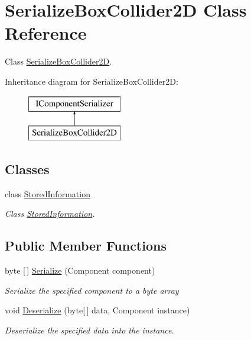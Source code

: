 \hypertarget{class_serialize_box_collider2_d}{}\section{Serialize\+Box\+Collider2D Class Reference}
\label{class_serialize_box_collider2_d}


Class \hyperlink{class_serialize_box_collider2_d}{Serialize\+Box\+Collider2D}.  


Inheritance diagram for Serialize\+Box\+Collider2D\+:\begin{figure}[H]
\begin{center}
\leavevmode
\includegraphics[height=2.000000cm]{class_serialize_box_collider2_d}
\end{center}
\end{figure}
\subsection*{Classes}
\begin{DoxyCompactItemize}
\item 
class \hyperlink{class_serialize_box_collider2_d_1_1_stored_information}{Stored\+Information}
\begin{DoxyCompactList}\small\item\em Class \hyperlink{class_serialize_box_collider2_d_1_1_stored_information}{Stored\+Information}. \end{DoxyCompactList}\end{DoxyCompactItemize}
\subsection*{Public Member Functions}
\begin{DoxyCompactItemize}
\item 
byte \mbox{[}$\,$\mbox{]} \hyperlink{class_serialize_box_collider2_d_ab002b432810dbe5029e486b8f0a85878}{Serialize} (Component component)
\begin{DoxyCompactList}\small\item\em Serialize the specified component to a byte array \end{DoxyCompactList}\item 
void \hyperlink{class_serialize_box_collider2_d_ad00de81c7e9e81bc30beb97194f34e17}{Deserialize} (byte\mbox{[}$\,$\mbox{]} data, Component instance)
\begin{DoxyCompactList}\small\item\em Deserialize the specified data into the instance. \end{DoxyCompactList}\end{DoxyCompactItemize}


